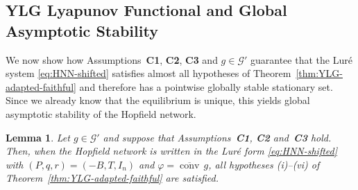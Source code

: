 \documentclass[journal]{IEEEtran}
\theoremstyle{myplain}
\newtheorem{lemma}{Lemma}
\begin{document}
\subsection{YLG Lyapunov Functional and Global Asymptotic Stability}
\label{subsec:YLG-main}

We now show how Assumptions~\textbf{C1}, \textbf{C2},
\textbf{C3} and $g\in\mathcal G'$ guarantee that the Lur\'e system
\eqref{eq:HNN-shifted} satisfies almost all hypotheses of Theorem~\ref{thm:YLG-adapted-faithful} and therefore has a pointwise globally stable
stationary set.  Since we already know that the equilibrium is unique,
this yields global asymptotic stability of the Hopfield network.


\begin{lemma}\label{lem:YLG-conditions}
Let $g\in\mathcal G'$ and suppose that Assumptions~\textbf{C1},
\textbf{C2} and~\textbf{C3} hold.  Then, when the Hopfield network
is written in the Lur\'e form \eqref{eq:HNN-shifted} with
$(P,q,r)=(-B,T,I_n)$ and $\varphi=\overline{\operatorname{conv}}\,g$, all hypotheses
\textup{(i)}–\textup{(vi)} of Theorem~\ref{thm:YLG-adapted-faithful} are satisfied.
\end{lemma}
\end{document}
